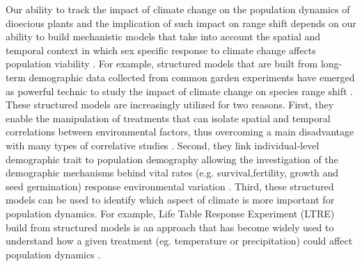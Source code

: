 \documentclass[12pt]{article}
\begin{document}
Our ability to track the impact of climate change on the population dynamics of dioecious plants and the implication of such impact on range shift depends on our ability to build mechanistic models that take into account the spatial and temporal context in which sex specific response to climate change affects population viability \citep{davis2001range,evans2016towards,czachura2020demographic}.
For example, structured models that are built from long-term demographic data collected from common garden experiments have emerged as powerful technic to study the impact of climate change on species range shift \citep{merow2017climate,schwinning2022common}.
These structured models are increasingly utilized for two reasons. 
First, they enable the manipulation of treatments that can isolate spatial and temporal correlations between environmental factors, thus overcoming a main disadvantage with many types of correlative studies \citep{leicht2007comparative}. 
Second, they link individual-level demographic trait to population demography allowing the investigation of the demographic mechanisms behind vital rates (e.g. survival,fertility, growth and seed germination) response environmental variation \citep{louthan2022climate,dahlgren2016demography}. 
Third, these structured models can be used to identify which aspect of climate is more important for population dynamics.
For example, Life Table Response Experiment (LTRE) build from structured models is an approach that has become widely used to understand how a given treatment (eg. temperature or precipitation) could affect population dynamics \citep {caswell1989analysis,o2024nonlinear,morrison2007demographic,iler2019reproductive}. 
\end{document}
